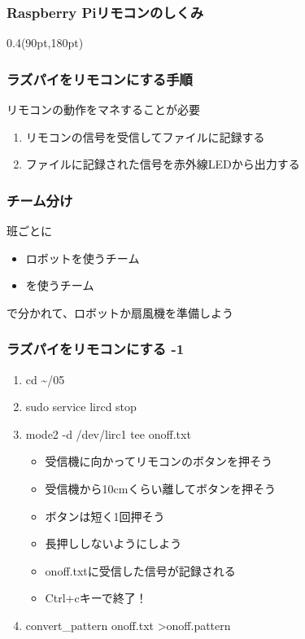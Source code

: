 \documentclass[slide05.tex]{subfiles}
\begin{document}
\begin{frame}
    \frametitle{Raspberry Piリモコンのしくみ}
    \vspace{12pt}
    \begin{center}
        
    \end{center}
    \begin{textblock*}{0.4\linewidth}(90pt,180pt)
    \end{textblock*}
\end{frame}

\begin{frame}
    \frametitle{ラズパイをリモコンにする手順} 
    リモコンの動作をマネすることが必要
    \begin{enumerate}
        \item リモコンの信号を受信してファイルに記録する
        \item ファイルに記録された信号を赤外線LEDから出力する
    \end{enumerate}
\end{frame}

\begin{frame}
    \frametitle{チーム分け}
    班ごとに
    \begin{itemize}
        \item ロボットを使うチーム
        \item {}を使うチーム
    \end{itemize}
    で分かれて、ロボットか扇風機を準備しよう
\end{frame}

\begin{frame}
    \frametitle{ラズパイをリモコンにする -1} 
    \begin{enumerate}
        \item cd \textasciitilde/05
        \item sudo service lircd stop
        \item mode2 -d /dev/lirc1 \textbar tee onoff.txt
        \begin{itemize}
            \item 受信機に向かってリモコンのボタンを押そう
            \item 受信機から10cmくらい離してボタンを押そう
            \item ボタンは短く1回押そう
            \item 長押ししないようにしよう
            \item onoff.txtに受信した信号が記録される
            \item Ctrl+cキーで終了！
        \end{itemize}
        \item convert\_pattern onoff.txt \textgreater \space onoff.pattern
    \end{enumerate}
\end{frame}
\end{document}
